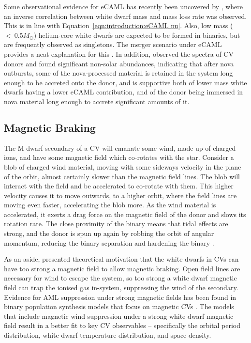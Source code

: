 Some observational evidence for eCAML has recently been uncovered by \citet{Pala2021}, where an inverse correlation between white dwarf mass and mass loss rate was observed. This is in line with Equation~\ref{eqn:introduction:eCAML nu}.
Also, low mass ($<~0.5M_\odot$) helium-core white dwarfs are expected to be formed in binaries, but are frequently observed as singletons. The merger scenario under eCAML provides a neat explanation for this \citep{zorotovic2017}.
In addition, \citet{sparks2021} observed the spectra of CV donors and found significant non-solar abundances,  indicating that after nova outbursts, some of the nova-processed material is retained in the system long enough to be accreted onto the donor, and is supportive both of lower mass white dwarfs having a lower eCAML contribution, and of the donor being immersed in nova material long enough to accrete significant amounts of it.


\subsection{Magnetic Braking}
\label{sect:introduction:magnetic braking}

The M dwarf secondary of a CV will emanate some wind, made up of charged ions, and have some magnetic field which co-rotates with the star.
Consider a blob of charged wind material, moving with some sideways velocity in the plane of the orbit, almost certainly slower than the magnetic field lines.
The blob will interact with the field and be accelerated to co-rotate with them.
This higher velocity causes it to move outwards, to a higher orbit, where the field lines are moving even faster, accelerating the blob more.
As the wind material is accelerated, it exerts a drag force on the magnetic field of the donor and slows its rotation rate.
The close proximity of the binary means that tidal effects are strong, and the donor is spun up again by robbing the orbit of angular momentum, reducing the binary separation and hardening the binary \citep{verbunt1981}.

As an aside, \citet{wickramasinghe1996} presented theoretical motivation that the white dwarfs in CVs can have too strong a magnetic field to allow magnetic braking. Open field lines are necessary for wind to escape the system, so too strong a white dwarf magnetic field can trap the ionised gas in-system, suppressing the wind of the secondary.
Evidence for AML suppression under strong magnetic fields has been found in binary population synthesis models that focus on magnetic CVs \citep{belloni2020}. The models that include magnetic wind suppression under a strong white dwarf magnetic field result in a better fit to key CV observables -- specifically the orbital period distribution, white dwarf temperature distribution, and space density.

